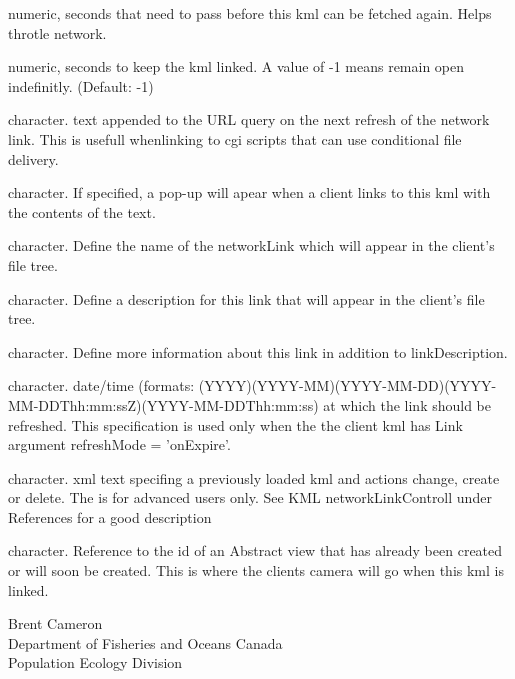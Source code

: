 \documentclass[a4paper]{book}
\begin{document}
\begin{Arguments}
\begin{ldescription}

\item[\code{minRefreshPeriod}] numeric, seconds that need to pass before this kml can be fetched again. Helps throtle network.


\item[\code{maxSessionLength}] numeric, seconds to keep the kml linked. A value of -1 means remain open indefinitly. (Default: -1)
\item[\code{cookie}] character. text appended to the URL query on the next refresh of the network link. This is usefull whenlinking to cgi scripts that can use conditional file delivery.
\item[\code{message}] character. If specified, a pop-up will apear when a client links to this kml with the contents of the text.
\item[\code{linkName}] character. Define the name of the networkLink which will appear in the client's file tree.
\item[\code{linkDescription}] character. Define a description for this link that will appear in the client's file tree.
\item[\code{linkSnippet}] character. Define more information about this link in addition to linkDescription.
\item[\code{expires}] character. date/time (formats: (YYYY)(YYYY-MM)(YYYY-MM-DD)(YYYY-MM-DDThh:mm:ssZ)(YYYY-MM-DDThh:mm:ss) at which the link should be refreshed. This specification is used only when the the client kml has Link argument refreshMode = 'onExpire'. 
\item[\code{update}] character. xml text specifing a previously loaded kml and actions change, create or delete. The is for advanced users only. See KML networkLinkControll under References for a good description
\item[\code{AbstractView}] character. Reference to the id of an Abstract view that has already been created or will soon be created. This is where the clients camera will go when this kml is linked.
\end{ldescription}
\end{Arguments}
%
\begin{Author}\relax
Brent Cameron\\{}
Department of Fisheries and Oceans Canada\\{}
Population Ecology Division
\end{Author}
%
\end{document}
